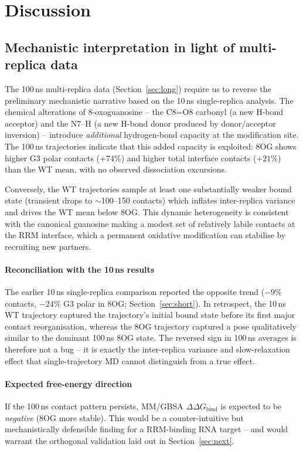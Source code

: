 \documentclass[11pt,a4paper]{article}
\begin{document}
\section{Discussion}
\label{sec:disc}

\subsection{Mechanistic interpretation in light of multi-replica data}
The 100\,ns multi-replica data (Section~\ref{sec:long}) require us to
reverse the preliminary mechanistic narrative based on the 10\,ns
single-replica analysis. The chemical alterations of 8-oxoguanosine --
the C8=O8 carbonyl (a new H-bond acceptor) and the N7--H (a new H-bond
donor produced by donor/acceptor inversion) -- introduce \emph{additional}
hydrogen-bond capacity at the modification site. The 100\,ns trajectories
indicate that this added capacity is exploited: 8OG shows higher G3
polar contacts ($+74\%$) and higher total interface contacts ($+21\%$)
than the WT mean, with no observed dissociation excursions.

Conversely, the WT trajectories sample at least one substantially
weaker bound state (transient drops to $\sim$100--150 contacts) which
inflates inter-replica variance and drives the WT mean below 8OG.
This dynamic heterogeneity is consistent with the canonical guanosine
making a modest set of relatively labile contacts at the RRM interface,
which a permanent oxidative modification can stabilise by recruiting
new partners.

\paragraph{Reconciliation with the 10\,ns results}
The earlier 10\,ns single-replica comparison reported the opposite
trend ($-9\%$ contacts, $-24\%$ G3 polar in 8OG; Section~\ref{sec:short}).
In retrospect, the 10\,ns WT trajectory captured the trajectory's
initial bound state before its first major contact reorganisation,
whereas the 8OG trajectory captured a pose qualitatively similar to
the dominant 100\,ns 8OG state. The reversed sign in 100\,ns averages
is therefore not a bug -- it is exactly the inter-replica variance and
slow-relaxation effect that single-trajectory MD cannot distinguish
from a true effect.

\paragraph{Expected free-energy direction}
If the 100\,ns contact pattern persists, MM/GBSA $\Delta\Delta G_{\text{bind}}$
is expected to be \emph{negative} (8OG more stable). This would be a
counter-intuitive but mechanistically defensible finding for a
RRM-binding RNA target -- and would warrant the orthogonal validation
laid out in Section~\ref{sec:next}.
\end{document}
